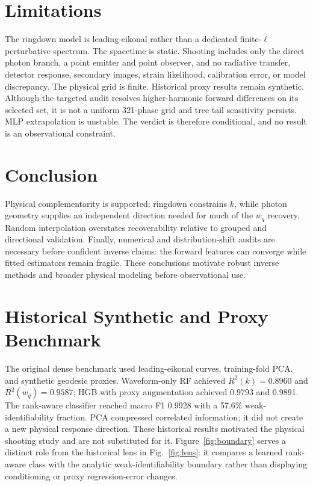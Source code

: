 \documentclass[10pt,twocolumn]{article}
\newcommand{\wq}{w_q}
\begin{document}
\section{Limitations}
The ringdown model is leading-eikonal rather than a dedicated finite-$\ell$
perturbative spectrum. The spacetime is static. Shooting includes only the
direct photon branch, a point emitter and point observer, and no radiative
transfer, detector response, secondary images, strain likelihood, calibration
error, or model discrepancy. The physical grid is finite. Historical proxy
results remain synthetic. Although the targeted audit resolves higher-harmonic
forward differences on its selected set, it is not a uniform 321-phase grid and
tree tail sensitivity persists. MLP extrapolation is unstable. The verdict is
therefore conditional, and no result is an observational constraint.

\section{Conclusion}
Physical complementarity is supported: ringdown constrains $k$, while photon
geometry supplies an independent direction needed for much of the $\wq$
recovery. Random interpolation overstates recoverability relative to grouped
and directional validation. Finally, numerical and distribution-shift audits
are necessary before confident inverse claims: the forward features can
converge while fitted estimators remain fragile. These conclusions motivate
robust inverse methods and broader physical modeling before observational use.

\FloatBarrier
\appendix
\section{Historical Synthetic and Proxy Benchmark}
\label{app:historical}
The original dense benchmark used leading-eikonal curves, training-fold PCA,
and synthetic geodesic proxies. Waveform-only RF achieved
$R^2(k)=0.8960$ and $R^2(\wq)=0.9587$; HGB with proxy augmentation achieved
0.9793 and 0.9891. The rank-aware classifier reached macro F1 0.9928 with a
57.6\% weak-identifiability fraction. PCA compressed correlated information; it
did not create a new physical response direction. These historical results
motivated the physical shooting study and are not substituted for it.
Figure~\ref{fig:boundary} serves a distinct role from the historical lens in
Fig.~\ref{fig:lens}: it compares a learned rank-aware class with the analytic
weak-identifiability boundary rather than displaying conditioning or proxy
regression-error changes.
\end{document}
